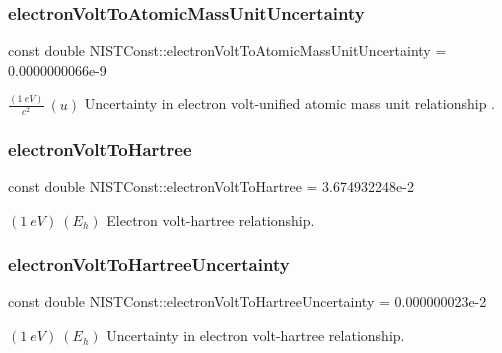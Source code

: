 \subsubsection{\texorpdfstring{electron\+Volt\+To\+Atomic\+Mass\+Unit\+Uncertainty}{electronVoltToAtomicMassUnitUncertainty}}
{\footnotesize\ttfamily const double N\+I\+S\+T\+Const\+::electron\+Volt\+To\+Atomic\+Mass\+Unit\+Uncertainty = 0.\+0000000066e-\/9}

$\frac{(1\ eV)}{c^2}\ (u)$ Uncertainty in electron volt-\/unified atomic mass unit relationship . \mbox{\label{group___n_i_s_t_const-_electron_volt_gab05ba497cc5a6bd566356469e9de003a}} 
\subsubsection{\texorpdfstring{electron\+Volt\+To\+Hartree}{electronVoltToHartree}}
{\footnotesize\ttfamily const double N\+I\+S\+T\+Const\+::electron\+Volt\+To\+Hartree = 3.\+674932248e-\/2}

$(1\ eV) \ (E_h)$ Electron volt-\/hartree relationship. \mbox{\label{group___n_i_s_t_const-_electron_volt_ga0abfaf6edc874d80488beab0633f353a}} 
\subsubsection{\texorpdfstring{electron\+Volt\+To\+Hartree\+Uncertainty}{electronVoltToHartreeUncertainty}}
{\footnotesize\ttfamily const double N\+I\+S\+T\+Const\+::electron\+Volt\+To\+Hartree\+Uncertainty = 0.\+000000023e-\/2}

$(1\ eV) \ (E_h)$ Uncertainty in electron volt-\/hartree relationship. \mbox{\label{group___n_i_s_t_const-_electron_volt_gae80c1242d33bf681a09a87d20cd4162e}} 
